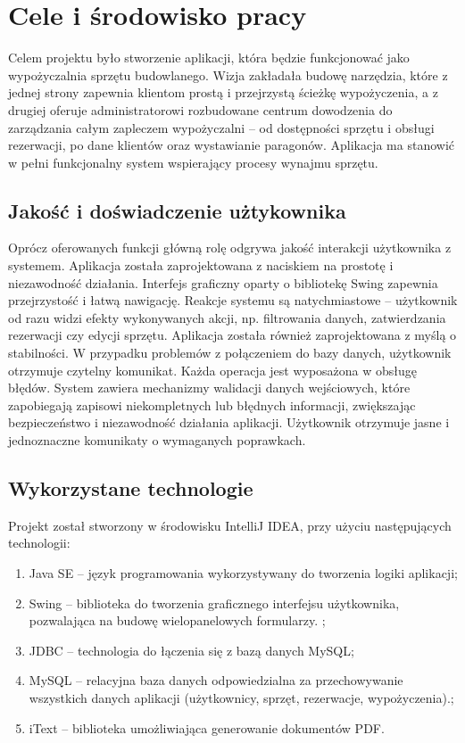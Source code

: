 \chapter{Cele i środowisko pracy}
\label{cha:Założenia, cele i środowisko pracy}
Celem projektu było stworzenie aplikacji, która będzie funkcjonować jako wypożyczalnia sprzętu budowlanego. Wizja zakładała budowę narzędzia, które z jednej strony zapewnia klientom prostą i przejrzystą ścieżkę wypożyczenia, a z drugiej oferuje administratorowi rozbudowane centrum dowodzenia do zarządzania całym zapleczem wypożyczalni – od dostępności sprzętu i obsługi rezerwacji, po dane klientów oraz wystawianie paragonów. Aplikacja ma stanowić w pełni funkcjonalny system wspierający procesy wynajmu sprzętu.

\section{Jakość i doświadczenie użtykownika}
\label{sec:JakoscIdoswiadczenieUzytkownika}

Oprócz oferowanych funkcji główną rolę odgrywa jakość interakcji użytkownika z systemem. Aplikacja została zaprojektowana z naciskiem na prostotę i niezawodność działania. Interfejs graficzny oparty o bibliotekę Swing zapewnia przejrzystość i łatwą nawigację. Reakcje systemu są natychmiastowe – użytkownik od razu widzi efekty wykonywanych akcji, np. filtrowania danych, zatwierdzania rezerwacji czy edycji sprzętu.  Aplikacja została również zaprojektowana z myślą o stabilności. W przypadku problemów z połączeniem do bazy danych, użytkownik otrzymuje czytelny komunikat. Każda operacja jest wyposażona w obsługę błędów. System zawiera mechanizmy walidacji danych wejściowych, które zapobiegają zapisowi niekompletnych lub błędnych informacji, zwiększając bezpieczeństwo i niezawodność działania aplikacji. Użytkownik otrzymuje jasne i jednoznaczne komunikaty o wymaganych poprawkach.

\section{Wykorzystane technologie}
\label{sec:wykorzystaneTechnologie}

Projekt został stworzony w środowisku IntelliJ IDEA, przy użyciu następujących technologii:

\begin{enumerate}%
\item Java SE – język programowania wykorzystywany do tworzenia logiki aplikacji;
\item Swing – biblioteka do tworzenia graficznego interfejsu użytkownika, pozwalająca na budowę wielopanelowych formularzy. ;
\item JDBC – technologia do łączenia się z bazą danych MySQL;
\item MySQL – relacyjna baza danych odpowiedzialna za przechowywanie wszystkich danych aplikacji (użytkownicy, sprzęt, rezerwacje, wypożyczenia).;
\item iText – biblioteka umożliwiająca generowanie dokumentów PDF.
\end{enumerate}


